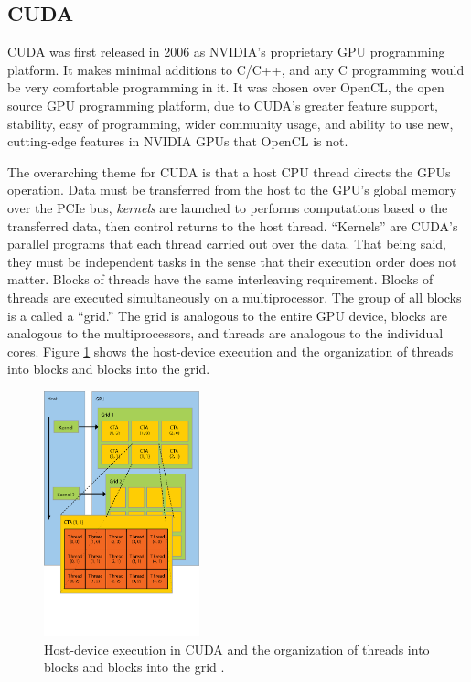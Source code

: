 \subsection{CUDA}

CUDA was first released in 2006 as NVIDIA's proprietary GPU programming platform.  It makes minimal additions to C/C++, and any C programming would be very comfortable programming in it.  It was chosen over OpenCL, the open source GPU programming platform, due to CUDA's greater feature support, stability, easy of programming, wider community usage, and ability to use new, cutting-edge features in NVIDIA GPUs that OpenCL is not.

The overarching theme for CUDA is that a host CPU thread directs the GPUs operation.  Data must be transferred from the host to the GPU's global memory over the PCIe bus, \emph{kernels} are launched to performs computations based o the transferred data, then control returns to the host thread.  ``Kernels'' are CUDA's parallel programs that each thread carried out over the data.  That being said, they must be independent tasks in the sense that their execution order does not matter.  Blocks of threads have the same interleaving requirement.  Blocks of threads are executed simultaneously on a multiprocessor.  The group of all blocks is a called a ``grid.''  The grid is analogous to the entire GPU device, blocks are analogous to the multiprocessors, and threads are analogous to the individual cores. Figure \ref{cuda_grid_launch} shows the host-device execution and the organization of threads into blocks and blocks into the grid.

\begin{figure}[h!] 
  \centering
    \includegraphics[width=0.4\textwidth,trim= 0cm 2.5cm 0cm 0cm]{graphics/CUDA_grid_launch.eps}
     \caption{ Host-device execution in CUDA and the organization of threads into blocks and blocks into the grid \cite{cuda_ptx_isa}. \label{cuda_grid_launch}}
\end{figure}


